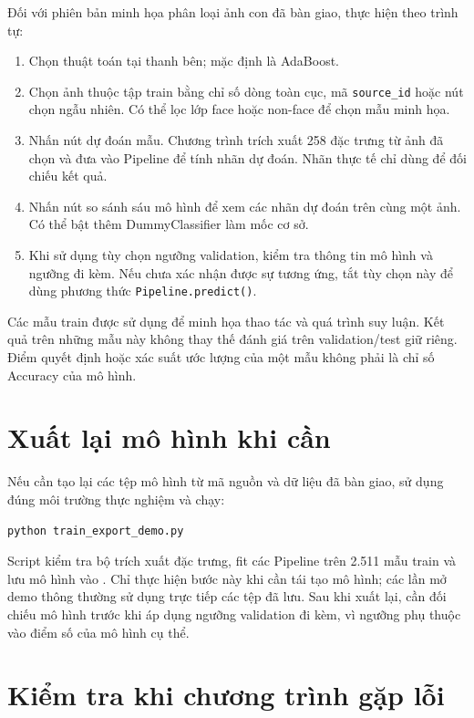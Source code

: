\documentclass[12pt,a4paper,oneside]{report}
\begin{document}
Đối với phiên bản minh họa phân loại ảnh con đã bàn giao,
thực hiện theo trình tự:

\begin{enumerate}
    \item Chọn thuật toán tại thanh bên; mặc định là AdaBoost.
    \item Chọn ảnh thuộc tập train bằng chỉ số dòng toàn cục,
    mã \texttt{source\_id} hoặc nút chọn ngẫu nhiên.
    Có thể lọc lớp face hoặc non-face để chọn mẫu minh họa.
    \item Nhấn nút dự đoán mẫu. Chương trình trích xuất 258 đặc trưng
    từ ảnh đã chọn và đưa vào Pipeline để tính nhãn dự đoán.
    Nhãn thực tế chỉ dùng để đối chiếu kết quả.
    \item Nhấn nút so sánh sáu mô hình để xem các nhãn dự đoán
    trên cùng một ảnh. Có thể bật thêm DummyClassifier làm mốc cơ sở.
    \item Khi sử dụng tùy chọn ngưỡng validation, kiểm tra thông tin
    mô hình và ngưỡng đi kèm. Nếu chưa xác nhận được sự tương ứng,
    tắt tùy chọn này để dùng phương thức \texttt{Pipeline.predict()}.
\end{enumerate}

Các mẫu train được sử dụng để minh họa thao tác và quá trình suy luận.
Kết quả trên những mẫu này không thay thế đánh giá trên validation/test
giữ riêng. Điểm quyết định hoặc xác suất ước lượng của một mẫu không
phải là chỉ số Accuracy của mô hình.

\section{Xuất lại mô hình khi cần}

Nếu cần tạo lại các tệp mô hình từ mã nguồn và dữ liệu đã bàn giao,
sử dụng đúng môi trường thực nghiệm và chạy:

\begin{lstlisting}[language={},numbers=none]
python train_export_demo.py
\end{lstlisting}

Script kiểm tra bộ trích xuất đặc trưng, fit các Pipeline trên
2.511 mẫu train và lưu mô hình vào .
Chỉ thực hiện bước này khi cần tái tạo mô hình; các lần mở demo thông thường
sử dụng trực tiếp các tệp đã lưu.
Sau khi xuất lại, cần đối chiếu mô hình trước khi áp dụng ngưỡng
validation đi kèm, vì ngưỡng phụ thuộc vào điểm số của mô hình cụ thể.

\section{Kiểm tra khi chương trình gặp lỗi}
\end{document}
